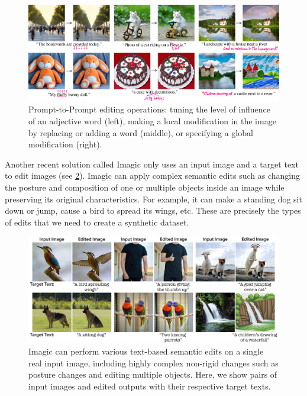 \begin{figure}[ht]
    \centering
    \includegraphics[width=\linewidth]{images/future/prompt-to-prompt.png}
    \caption{Prompt-to-Prompt editing operations: tuning the level of influence of an adjective word (left), making a local modification in the image by replacing or adding a word (middle), or specifying a global modification (right).}
    \label{fig:prompt-to-prompt}
\end{figure}

Another recent solution called Imagic \cite{kawar2022imagic} only uses an input image and a target text to edit images (see \cref{fig:imagic}). Imagic can apply complex semantic edits such as changing the posture and composition of one or multiple objects inside
an image while preserving its original characteristics. For example, it can make a standing dog sit down or jump, cause a bird to spread its wings, etc. These are precisely the types of edits that we need to create a synthetic dataset.

\begin{figure}[ht]
    \centering
    \includegraphics[width=\linewidth]{images/future/imagic.jpg}
    \caption{Imagic can perform various text-based semantic edits on a single real input image, including highly complex non-rigid changes such as posture changes and editing multiple objects. Here, we show pairs of input images and edited outputs with their respective target texts.}
    \label{fig:imagic}
\end{figure}

